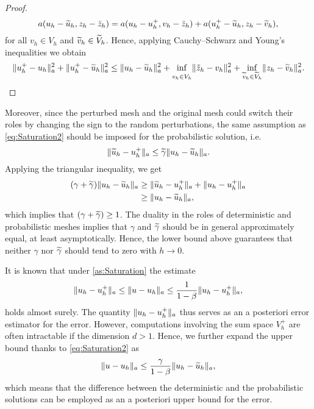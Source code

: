 \documentclass[10pt]{article}
\begin{document}
\begin{proof}
	\begin{equation}
		a(u_h - \widetilde u_h, z_h - \tilde z_h) = a(u_h - u_h^+, v_h - \tilde z_h) + a(u_h^+ - \widetilde u_h, z_h - \widetilde v_h),
	\end{equation} 
	for all $v_h \in V_h$ and $\widetilde v_h \in \widetilde V_h$. Hence, applying Cauchy--Schwarz and Young's inequalities we obtain
	\begin{equation}
		\normm{u_h^+ - u_h}^2 + \normm{u_h^+ - \btilde u_h}^2 \leq \normm{u_h - \btilde u_h}^2 + \inf_{\vphantom{\btilde v_h \in \btilde V_h}v_h \in V_h} \normm{\tilde z_h - v_h}^2 + \inf_{\btilde v_h \in \btilde V_h} \normm{z_h - \btilde v_h}^2.
	\end{equation} 
\end{proof}

Moreover, since the perturbed mesh and the original mesh could switch their roles by changing the sign to the random perturbations, the same assumption as \eqref{eq:Saturation2} should be imposed for the probabilistic solution, i.e.
\begin{equation}
	\lVert\widetilde u_h - u_h^+\rVert_a \leq \widetilde \gamma \lVert u_h - \widetilde u_h\rVert_a.
\end{equation}
Applying the triangular inequality, we get
\begin{equation}
\begin{aligned}
	(\gamma + \widetilde \gamma) \lVert u_h - \widetilde u_h\rVert_a &\geq \lVert\widetilde u_h - u_h^+\rVert_a + \lVert u_h - u_h^+\rVert_a \\
	& \geq \lVert u_h - \widetilde u_h\rVert_a,
\end{aligned}
\end{equation}
which implies that $(\gamma + \widetilde \gamma) \geq 1$. The duality in the roles of deterministic and probabilistic meshes implies that $\gamma$ and $\widetilde \gamma$ should be in general approximately equal, at least asymptotically. Hence, the lower bound above guarantees that neither $\gamma$ nor $\widetilde \gamma$ should tend to zero with $h\to 0$.

It is known \cite{BaK93} that under \cref{as:Saturation} the estimate
\begin{equation}
	\lVert u_h - u_h^+\rVert_a \leq \lVert u - u_h\rVert_a \leq \frac{1}{1 - \beta} \lVert u_h - u_h^+\rVert_a,
\end{equation}
holds almost surely. The quantity $\lVert u_h - u_h^+\rVert_a$ thus serves as an a posteriori error estimator for the error. However, computations involving the sum space $V_h^+$ are often intractable if the dimension $d > 1$. Hence, we further expand the upper bound thanks to \eqref{eq:Saturation2} as
\begin{equation}\label{eq:ErrorEstimateFinal}
	\lVert u - u_h\rVert_a \leq \frac{\gamma}{1 - \beta} \lVert u_h - \widetilde u_h\rVert_a,
\end{equation}
which means that the difference between the deterministic and the probabilistic solutions can be employed as an a posteriori upper bound for the error.
\end{document}
